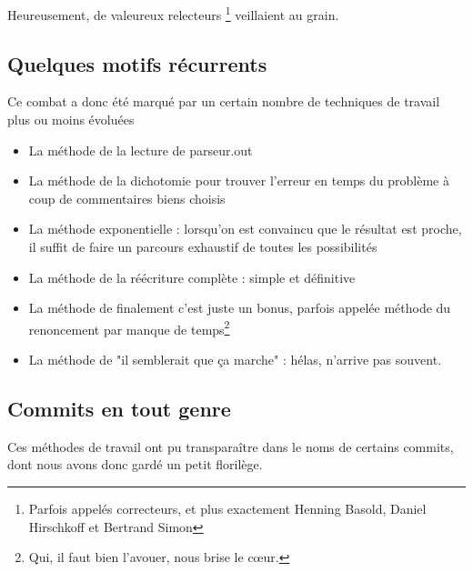 \documentclass{article}
\begin{document}
	Heureusement, de valeureux relecteurs \footnote{Parfois appelés correcteurs, et plus exactement Henning Basold,
	Daniel Hirschkoff et 
	Bertrand Simon} veillaient au grain.

	\subsection{Quelques motifs récurrents}
	
		Ce combat a donc été marqué par un certain nombre de techniques de travail plus ou moins évoluées
		
		\begin{itemize}
			\item La méthode de la lecture de parseur.out
			\item La méthode de la dichotomie pour trouver l'erreur en temps  du problème à coup de commentaires biens choisis
			\item La méthode exponentielle : lorsqu'on est convaincu que le résultat est proche, il suffit de faire un parcours exhaustif de toutes les possibilités
			\item La méthode de la réécriture complète : simple et définitive
			\item La méthode de finalement c'est juste un bonus, parfois appelée méthode du renoncement par manque de temps\footnote{Qui, il faut bien l'avouer, nous brise le cœur.}
			\item La méthode de "il semblerait que ça marche" : hélas, n'arrive pas souvent.
		\end{itemize}
	
	\subsection{Commits en tout genre}
	
		Ces méthodes de travail ont pu transparaître dans le noms de certains commits, dont nous avons donc gardé un petit florilège.
		
\end{document}
